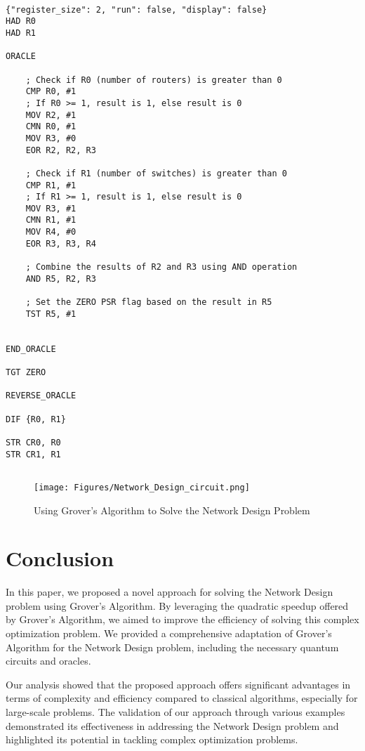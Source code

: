 \begin{lstlisting}

{"register_size": 2, "run": false, "display": false}
HAD R0
HAD R1

ORACLE

    ; Check if R0 (number of routers) is greater than 0
    CMP R0, #1
    ; If R0 >= 1, result is 1, else result is 0
    MOV R2, #1
    CMN R0, #1
    MOV R3, #0
    EOR R2, R2, R3

    ; Check if R1 (number of switches) is greater than 0
    CMP R1, #1
    ; If R1 >= 1, result is 1, else result is 0
    MOV R3, #1
    CMN R1, #1
    MOV R4, #0
    EOR R3, R3, R4

    ; Combine the results of R2 and R3 using AND operation
    AND R5, R2, R3

    ; Set the ZERO PSR flag based on the result in R5
    TST R5, #1


END_ORACLE

TGT ZERO

REVERSE_ORACLE

DIF {R0, R1}

STR CR0, R0
STR CR1, R1


\end{lstlisting}

\begin{figure}[htp]
    \centering
    \texttt{[image: Figures/Network\_Design\_circuit.png]}
    \caption{Using Grover's Algorithm to Solve the Network Design Problem}
    \label{fig:Network_Design}
\end{figure}

\section{Conclusion} \label{sec:conclusion}

In this paper, we proposed a novel approach for solving the Network Design problem using Grover's Algorithm. By leveraging the quadratic speedup offered by Grover's Algorithm, we aimed to improve the efficiency of solving this complex optimization problem. We provided a comprehensive adaptation of Grover's Algorithm for the Network Design problem, including the necessary quantum circuits and oracles.

Our analysis showed that the proposed approach offers significant advantages in terms of complexity and efficiency compared to classical algorithms, especially for large-scale problems. The validation of our approach through various examples demonstrated its effectiveness in addressing the Network Design problem and highlighted its potential in tackling complex optimization problems.

